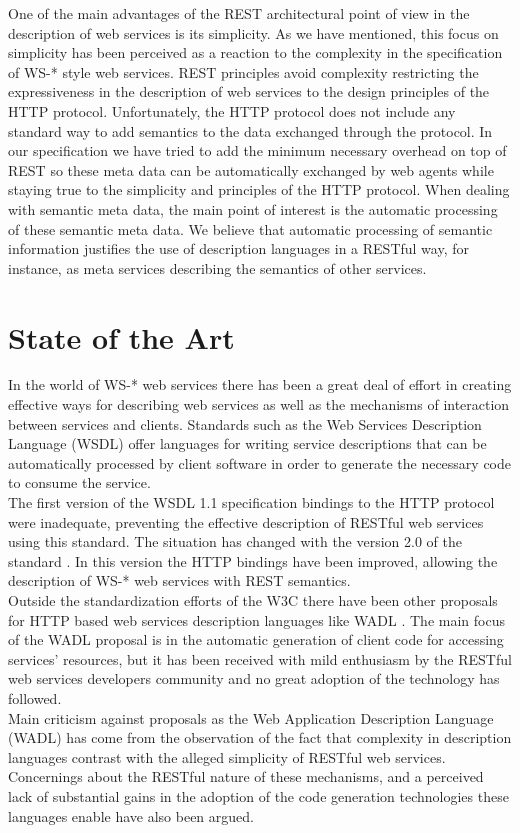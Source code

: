 One of the main advantages of the REST architectural point of view in the description of web services is its
simplicity. As we have mentioned, this focus on simplicity has been perceived as a reaction to the complexity in the
specification of WS-* style web services. REST principles avoid complexity restricting the expressiveness in the
description of web services to the design principles of the HTTP protocol. Unfortunately, the HTTP protocol  does not include any
standard way to add semantics to the data exchanged through the protocol. In our specification we have tried to add the
minimum necessary overhead on top of REST so these meta data can be automatically exchanged by web agents while staying true to the
simplicity and principles of the HTTP protocol. When dealing with semantic meta data, the main point of interest is the automatic processing of these semantic meta data. We believe that automatic processing of semantic information justifies the use of description languages in a RESTful way, for instance, as meta services describing the semantics of other services.

\section{State of the Art}
In the world of WS-* web services there has been a great deal of effort in creating effective ways for describing web
services as well as the mechanisms of interaction between services and clients. Standards such as the Web Services
Description Language (WSDL) \cite{w3cwsdl}
offer languages for writing service descriptions that can be automatically processed by client software in order to
generate the necessary code to consume the service.\\
The first version of the WSDL 1.1 specification bindings to the HTTP protocol were inadequate, preventing the
effective description of RESTful web services using this standard. The situation has changed with the version 2.0 of the standard
\cite{w3cwsdl2}. In this version the HTTP bindings have been improved, allowing the description of WS-* web services with
REST semantics.\\
Outside the standardization efforts of the W3C there have been other proposals for HTTP based web services description
languages like WADL \cite{wadl}. The main focus of the WADL proposal is in the automatic generation of client code for
accessing services' resources,  but it has been received with mild
enthusiasm by the RESTful web services developers community and no great adoption of the technology has followed. \\
Main criticism against proposals as the Web Application Description Language (WADL) \cite{wadl} has come from the observation of the
fact that complexity in description languages contrast with the alleged simplicity of RESTful web services.
Concernings about the RESTful nature of these mechanisms, and a perceived lack of substantial gains in the adoption of the
code generation technologies these languages enable have also been argued.\\


